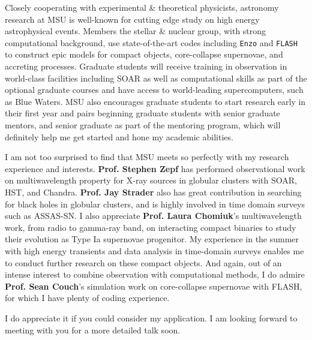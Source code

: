 \documentclass[11pt, a4paper]{awesome-cv} %
\begin{document}
\begin{cvletter}
Closely cooperating with experimental \& theoretical physicists, astronomy research at MSU is well-known for cutting edge study on high energy astrophysical events. Members the stellar \& nuclear group, with strong computational background, use state-of-the-art codes including \texttt{Enzo} and \texttt{FLASH} to construct epic models for compact objects, core-collapse supernovae, and accreting processes. Graduate students will receive training in observation in world-class facilities including SOAR as well as computational skills as part of the optional graduate courses and have access to world-leading supercomputers, such as Blue Waters. MSU also encourages graduate students to start research early in their first year and pairs beginning graduate students with senior graduate mentors, and senior graduate as part of the mentoring program, which will definitely help me get started and hone my academic abilities.

I am not too surprised to find that MSU meets so perfectly with my research experience and interests. \textbf{Prof. Stephen Zepf} has performed observational work on multiwavelength property for X-ray sources in globular clusters with SOAR, HST, and Chandra. \textbf{Prof. Jay Strader} also has great contribution in searching for black holes in globular clusters, and is highly involved in time domain surveys such as ASSAS-SN. I also appreciate \textbf{Prof. Laura Chomiuk}’s multiwavelength work, from radio to gamma-ray band, on interacting compact binaries to study their evolution as Type Ia supernovae progenitor. My experience in the summer with high energy transients and data analysis in time-domain surveys enables me to conduct further research on these compact objects. And again, out of an intense interest to combine observation with computational methods, I do admire \textbf{Prof. Sean Couch}’s simulation work on core-collapse supernovae with FLASH, for which I have plenty of coding experience.


I do appreciate it if you could consider my application. I am looking forward to meeting with you for a more detailed talk soon.

\end{cvletter}


\end{document}
